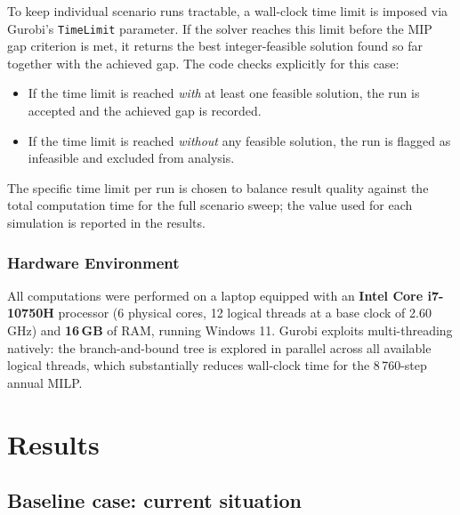 \documentclass[11pt,a4paper]{report}
\begin{document}
To keep individual scenario runs tractable, a wall-clock time limit is imposed
via Gurobi's \texttt{TimeLimit} parameter.
If the solver reaches this limit before the MIP gap criterion is met, it
returns the best integer-feasible solution found so far together with the
achieved gap.
The code checks explicitly for this case:
\begin{itemize}
    \item If the time limit is reached \emph{with} at least one feasible
          solution, the run is accepted and the achieved gap is recorded.
    \item If the time limit is reached \emph{without} any feasible solution,
          the run is flagged as infeasible and excluded from analysis.
\end{itemize}
The specific time limit per run is chosen to balance result quality against
the total computation time for the full scenario sweep; the value used for
each simulation is reported in the results.

\subsection*{Hardware Environment}

All computations were performed on a laptop equipped with an
\textbf{Intel Core i7-10750H} processor (6 physical cores, 12 logical
threads at a base clock of 2.60\,GHz) and \textbf{16\,GB} of RAM, running
Windows 11.
Gurobi exploits multi-threading natively: the branch-and-bound tree is
explored in parallel across all available logical threads, which substantially
reduces wall-clock time for the 8\,760-step annual MILP.








\chapter{Results}
\label{chap:results}

\section{Baseline case: current situation}
\label{sec:results_baseline}
\end{document}
